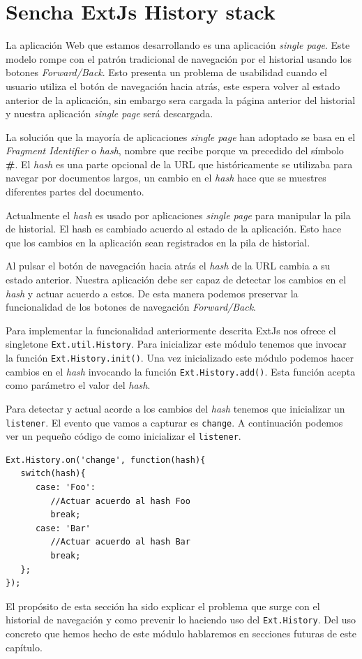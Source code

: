 \section{Sencha ExtJs History stack}
	La aplicación Web que estamos desarrollando es una aplicación \emph{single page}. Este modelo rompe con el patrón tradicional de navegación
	por el historial usando los botones \emph{Forward/Back}. Esto presenta un problema de usabilidad cuando el usuario utiliza el botón de
	navegación hacia atrás, este espera volver al estado anterior de la aplicación, sin embargo sera cargada la página anterior del historial y
	nuestra aplicación \emph{single page} será descargada.
	\par
	La solución que la mayoría de aplicaciones \emph{single page} han adoptado se basa en el \emph{Fragment Identifier}  o \emph{hash}, nombre que
	recibe porque va precedido del símbolo \textbf{\#}. El \emph{hash} es una parte opcional de la URL que históricamente se utilizaba para navegar
	por documentos largos, un cambio en el \emph{hash} hace que se muestres diferentes partes del documento.
	\par
	Actualmente el \emph{hash} es usado por aplicaciones \emph{single page} para manipular la pila de historial. El hash es cambiado acuerdo al
	estado de la aplicación. Esto hace que los cambios en la aplicación sean registrados en la pila de historial.
	\par
	Al pulsar el botón de navegación hacia atrás el \emph{hash} de la URL cambia a su estado anterior. Nuestra aplicación debe ser capaz de
	detectar los cambios en el \emph{hash} y actuar acuerdo a estos. De esta manera podemos preservar la funcionalidad de los botones de
	navegación \emph{Forward/Back}. 
	\par
	Para implementar la funcionalidad anteriormente descrita ExtJs nos ofrece el singletone \texttt{Ext.util.History}. Para inicializar este módulo
	tenemos que invocar la función \texttt{Ext.History.init()}. Una vez inicializado este módulo podemos hacer cambios en el \emph{hash} invocando
	la función \texttt{Ext.History.add()}. Esta función acepta como parámetro el valor del \emph{hash}. 
	\par
	Para detectar y actual acorde a los cambios del \emph{hash} tenemos que inicializar un \texttt{listener}. El evento que vamos a capturar es
	\texttt{change}. A continuación podemos ver un pequeño código de como inicializar el \texttt{listener}.
	\begin{lstlisting}
Ext.History.on('change', function(hash){
   switch(hash){
      case: 'Foo':
         //Actuar acuerdo al hash Foo
         break;
      case: 'Bar'
         //Actuar acuerdo al hash Bar
         break;
   };
});
	\end{lstlisting}
	\par
	El propósito de esta sección ha sido explicar el problema que surge con el historial de navegación y como prevenir lo haciendo uso del
	\texttt{Ext.History}. Del uso concreto que hemos hecho de este módulo hablaremos en secciones futuras de este capítulo.

